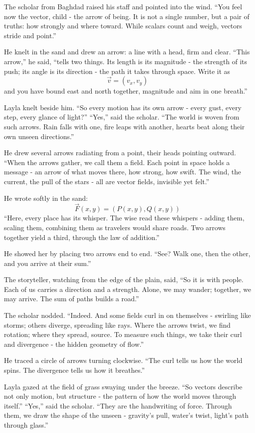 \documentclass[
  letterpaper,
  DIV=11,
  numbers=noendperiod]{scrreprt}
\begin{document}
The scholar from Baghdad raised his staff and pointed into the wind.
``You feel now the vector, child - the arrow of being. It is not a
single number, but a pair of truths: how strongly and where toward.
While scalars count and weigh, vectors stride and point.''

He knelt in the sand and drew an arrow: a line with a head, firm and
clear. ``This arrow,'' he said, ``tells two things. Its length is its
magnitude - the strength of its push; its angle is its direction - the
path it takes through space. Write it as \[
\vec{v} = (v_x, v_y)
\] and you have bound east and north together, magnitude and aim in one
breath.''

Layla knelt beside him. ``So every motion has its own arrow - every
gust, every step, every glance of light?'' ``Yes,'' said the scholar.
``The world is woven from such arrows. Rain falls with one, fire leaps
with another, hearts beat along their own unseen directions.''

He drew several arrows radiating from a point, their heads pointing
outward. ``When the arrows gather, we call them a field. Each point in
space holds a message - an arrow of what moves there, how strong, how
swift. The wind, the current, the pull of the stars - all are vector
fields, invisible yet felt.''

He wrote softly in the sand: \[
\vec{F}(x, y) = (P(x, y), Q(x, y))
\] ``Here, every place has its whisper. The wise read these whispers -
adding them, scaling them, combining them as travelers would share
roads. Two arrows together yield a third, through the law of addition.''

He showed her by placing two arrows end to end. ``See? Walk one, then
the other, and you arrive at their sum.''

The storyteller, watching from the edge of the plain, said, ``So it is
with people. Each of us carries a direction and a strength. Alone, we
may wander; together, we may arrive. The sum of paths builds a road.''

The scholar nodded. ``Indeed. And some fields curl in on themselves -
swirling like storms; others diverge, spreading like rays. Where the
arrows twist, we find rotation; where they spread, source. To measure
such things, we take their curl and divergence - the hidden geometry of
flow.''

He traced a circle of arrows turning clockwise. ``The curl tells us how
the world spins. The divergence tells us how it breathes.''

Layla gazed at the field of grass swaying under the breeze. ``So vectors
describe not only motion, but structure - the pattern of how the world
moves through itself.'' ``Yes,'' said the scholar. ``They are the
handwriting of force. Through them, we draw the shape of the unseen -
gravity's pull, water's twist, light's path through glass.''
\end{document}
